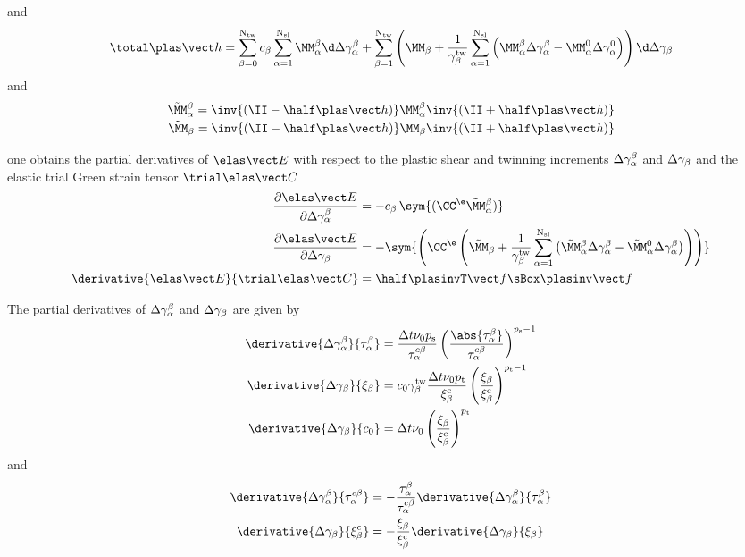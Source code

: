   and
  \begin{equation}
      \dhhp =  \sumbO \cb \sumaI \MMab \d \Delta \gammaab + \sumbI \left(\MMb + \frac{1}{\gammatwb}\sumaI\left(\MMab\Delta\gammaab-\MMaO\Delta\gammaaO\right)\right)  \d \Delta \gammab
      \label{eq:dhhp}
  \end{equation}
  and 
  \begin{equation}
    \begin{split}
      \MMabtilde = \inv{\IIminus} \MMab \inv{\IIplus} \\
      \MMbtilde = \inv{\IIminus} \MMb \inv{\IIplus}
    \end{split}
  \end{equation}
  
  one obtains the partial derivatives of $\EEe$ with respect to the plastic shear and twinning increments $\Delta\gamma^{\beta}_{\alpha}$ and $\Delta\gamma_{\beta}$ and the elastic trial Green strain tensor $\CCetr$
  \begin{align}
    \dEEeDDeltagammaab &= - \cb \, \sym{(\CCe \MMabtilde)} \label{eq:dEEeDDeltagammaab}\\
    \dEEeDDeltagammab &= - \sym{\left(\CCe \left(\MMbtilde+\frac{1}{\gammatwb}\sumaI \left(\MMabtilde\Delta\gammaab-\MMaOtilde\Delta\gammaab\right)\right)\right)} \label{eq:dEEeDDeltagammab}\\
    \derivative{\EEe}{\CCetr} &= \half \ffpinvT \sBox \ffpinv
  \end{align}
  
  The partial derivatives of $\Delta\gamma^{\beta}_{\alpha}$ and $\Delta\gamma_{\beta}$ are given by 
  \begin{align}
    \derivative{\Delta\gammaab}{\tauab} &= \frac{\Dt \nu_0 \psl}{\tauacb} \left(\frac{\abs{\tauab}}{\tauacb} \right)^{\psl-1} \\
    \derivative{\Delta\gammab}{\xib} &= c_0 \gammatwb \frac{\Dt \nu_0 \ptw}{\xibc} \left(\frac{\xib}{\xibc} \right)^{\ptw-1} \\
    \derivative{\Delta\gammab}{c_0} &= \Dt \nu_0 \left(\frac{\xib}{\xibc} \right)^{\ptw}
  \end{align}
  and
  \begin{align}
    \derivative{\Delta\gammaab}{\tauacb} &= - \frac{\tauab}{\tauacb} \derivative{\Delta\gammaab}{\tauab} \\
    \derivative{\Delta\gammab}{\xibc} &= -\frac{\xib}{\xibc} \derivative{\Delta\gammab}{\xib}
  \end{align}
  
